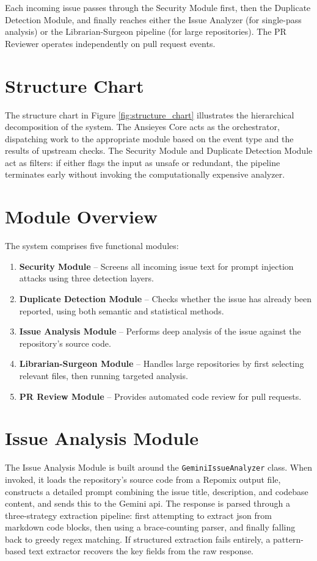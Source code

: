 Each incoming issue passes through the Security Module first, then the Duplicate Detection Module, and finally reaches either the Issue Analyzer (for single-pass analysis) or the Librarian-Surgeon pipeline (for large repositories). The PR Reviewer operates independently on pull request events.

\section{Structure Chart}

The structure chart in Figure \ref{fig:structure_chart} illustrates the hierarchical decomposition of the system. The Ansieyes Core acts as the orchestrator, dispatching work to the appropriate module based on the event type and the results of upstream checks. The Security Module and Duplicate Detection Module act as filters: if either flags the input as unsafe or redundant, the pipeline terminates early without invoking the computationally expensive analyzer.

\section{Module Overview}

The system comprises five functional modules:

\begin{enumerate}
\item \textbf{Security Module} -- Screens all incoming issue text for prompt injection attacks using three detection layers.
\item \textbf{Duplicate Detection Module} -- Checks whether the issue has already been reported, using both semantic and statistical methods.
\item \textbf{Issue Analysis Module} -- Performs deep analysis of the issue against the repository's source code.
\item \textbf{Librarian-Surgeon Module} -- Handles large repositories by first selecting relevant files, then running targeted analysis.
\item \textbf{PR Review Module} -- Provides automated code review for pull requests.
\end{enumerate}

\section{Issue Analysis Module}

The Issue Analysis Module is built around the \texttt{GeminiIssueAnalyzer} class. When invoked, it loads the repository's source code from a Repomix output file, constructs a detailed prompt combining the issue title, description, and codebase content, and sends this to the Gemini \gls{api}. The response is parsed through a three-strategy extraction pipeline: first attempting to extract \gls{json} from markdown code blocks, then using a brace-counting parser, and finally falling back to greedy regex matching. If structured extraction fails entirely, a pattern-based text extractor recovers the key fields from the raw response.


